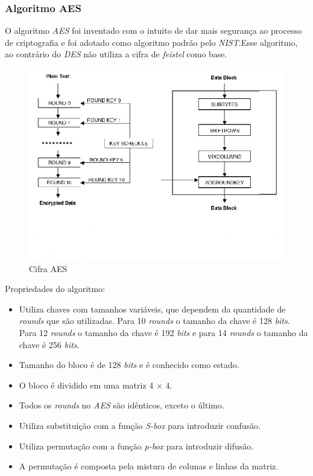 \subsubsection{Algoritmo AES}

O algoritmo \textit{AES} foi inventado com o intuito de dar mais segurança ao processo de criptografia e foi adotado como algoritmo padrão pelo \textit{NIST}.Esse algoritmo, ao contrário do \textit{DES} não utiliza a cifra de \textit{feistel} como base. 

\begin{figure}[h]
	\centering
	\includegraphics[scale=2]
		{figuras/aes_cipher.eps}
		\caption[Cifra\textit{AES}]{Cifra AES\protect\footnotemark} 
\end{figure}

Propriedades do algoritmo:

\begin{itemize}
	\item Utiliza chaves com tamanhos variáveis, que dependem da quantidade de \textit{rounds} que são utilizadas. Para 10 \textit{rounds} o tamanho da chave é 128 \textit{bits}. Para 12 \textit{rounds} o tamanho da chave é 192 \textit{bits} e para 14 \textit{rounds} o tamanho da chave é 256 \textit{bits}.
	\item Tamanho do bloco é de 128 \textit{bits} e é conhecido como estado.
	\item O bloco é dividido em uma matriz 4 $\times$ 4.
	\item Todos os \textit{rounds} no \textit{AES} são idênticos, exceto o último.
	\item Utiliza substituição com a função \textit{S-box} para introduzir confusão.
	\item Utiliza permutação com a função \textit{p-box} para introduzir difusão. 
	\item A permutação é composta pela mistura de colunas e linhas da matriz.
\end{itemize}
